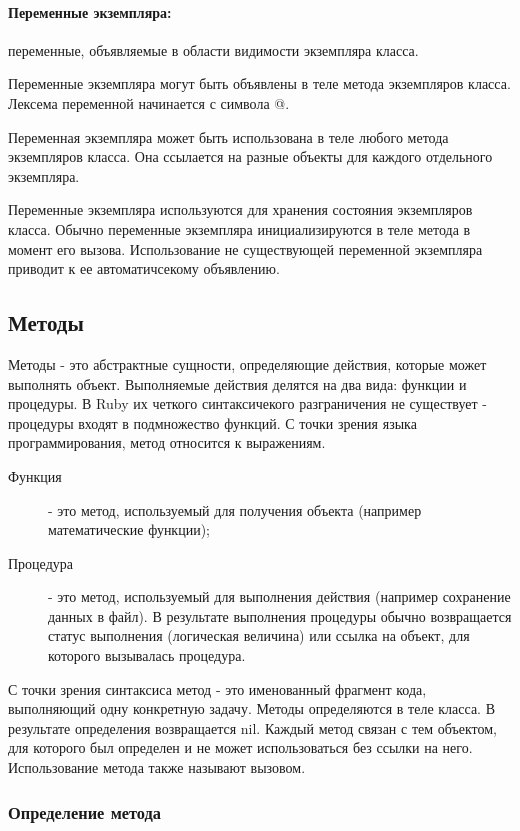 \paragraph*{Переменные экземпляра:} переменные, объявляемые в области видимости экземпляра класса.

Переменные экземпляра могут быть объявлены в теле метода экземпляров класса. Лексема переменной начинается с символа @. 

Переменная экземпляра может быть использована в теле любого метода экземпляров класса. Она ссылается на разные объекты для каждого отдельного экземпляра.

Переменные экземпляра используются для хранения состояния экземпляров класса. Обычно переменные экземпляра инициализируются в теле метода в момент его вызова. Использование не существующей переменной экземпляра приводит к ее автоматичсекому объявлению.

\subsection{Методы}

Методы - это абстрактные сущности, определяющие действия, которые может выполнять объект. Выполняемые действия делятся на два вида: функции и процедуры. В Ruby их четкого синтаксичекого разграничения не существует - процедуры входят в подмножество функций. С точки зрения языка программирования, метод относится к выражениям.
\begin{description}
  \item[Функция] - это метод, используемый для получения объекта (например математические функции);

  \item[Процедура] - это метод, используемый для выполнения действия (например сохранение данных в файл). В результате выполнения процедуры обычно возвращается статус выполнения (логическая величина) или ссылка на объект, для которого вызывалась процедура.
\end{description}

С точки зрения синтаксиса метод - это именованный фрагмент кода, выполняющий одну конкретную задачу. Методы определяются в теле класса. В результате определения возвращается nil. Каждый метод связан с тем объектом, для которого был определен и не может использоваться без ссылки на него. Использование метода также называют вызовом.

\subsubsection*{Определение метода}

